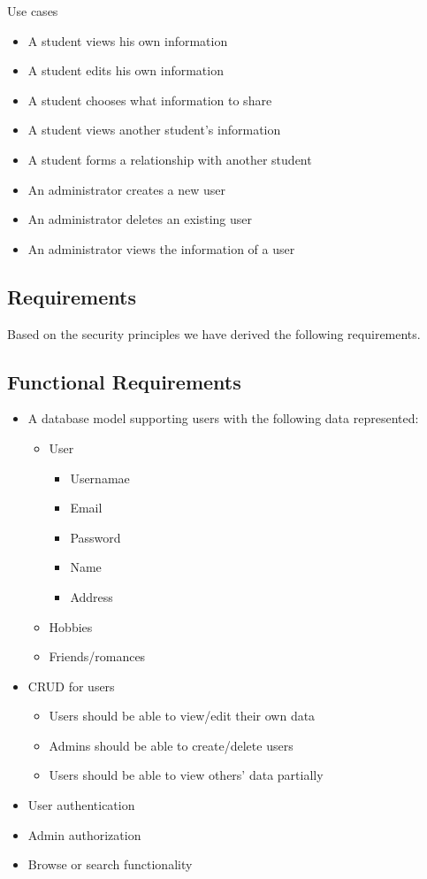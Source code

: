\documentclass[a4paper]{article}
\begin{document}
Use cases
\begin{itemize}
\item A student views his own information
\item A student edits his own information
\item A student chooses what information to share
\item A student views another student’s information
\item A student forms a relationship with another student
\item An administrator creates a new user
\item An administrator deletes an existing user
\item An administrator views the information of a user
\end{itemize}

\subsection{Requirements}
Based on the security principles we have derived the following requirements.

\subsection{Functional Requirements}
\begin{itemize}
\item A database model supporting users with the following data represented:
  \begin{itemize}
  \item User
      \begin{itemize}
      \item Usernamae
      \item Email
      \item Password
      \item Name
      \item Address
      \end{itemize}
  \item Hobbies
  \item Friends/romances
  \end{itemize}
\item CRUD for users
	\begin{itemize}
    \item Users should be able to view/edit their own data
    \item Admins should be able to create/delete users
    \item Users should be able to view others' data partially
    \end{itemize}
\item User authentication
\item Admin authorization
\item Browse or search functionality
\end{itemize}
\end{document}
